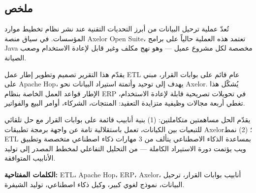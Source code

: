 \begin{Arabic}
\chapter*{ملخص}

\vspace{0.5cm}

تُعدّ عملية ترحيل البيانات من أبرز التحديات التقنية عند نشر نظام تخطيط موارد المؤسسات. في سياق منصة Axelor Open Suite، تعتمد هذه العملية حالياً على برامج Java مخصصة لكل مشروع عميل — وهو نهج مكلف وغير قابل لإعادة الاستخدام وصعب الصيانة.

يقدّم هذا التقرير تصميم وتطوير إطار عمل ETL عام قائم على بوابات القرار، مبني على Apache Hop، يهدف إلى توحيد وأتمتة استيراد البيانات نحو Axelor. يُشكّل هذا الإطار قواعد العمل الخاصة بنظام ERP في تحويلات تصريحية قابلة لإعادة الاستخدام، تغطي أربعة مجالات وظيفية متزايدة التعقيد: المنتجات، الشركاء، أوامر البيع والفواتير.

يقدّم الحل مساهمتين متكاملتين: (1) بنية أنابيب قائمة على بوابات القرار مع حل تلقائي للتبعيات بين الكيانات، تعمل باستقلالية تامة عن واجهة برمجة تطبيقات Axelor؛ (2) نمط ETL بمساعدة الذكاء الاصطناعي يتألف من 3 مهارات ذكاء اصطناعي متخصصة وتطبيق ويب  يؤتمت دورة الاستيراد الكاملة — من التحليل التفاعلي لمخطط المصدر إلى توليد الأنابيب المتوافقة.

\textbf{الكلمات المفتاحية:} ETL، Apache Hop، ERP، Axelor، أنابيب بوابات القرار، ترحيل البيانات، نموذج لغوي كبير، وكيل ذكاء اصطناعي، توليد الشيفرة.

\end{Arabic}
